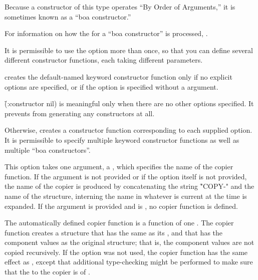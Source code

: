 Because a constructor of this type operates ``By Order of Arguments,''
it is sometimes known as a ``boa constructor.''

For information on how the  for a ``boa constructor'' is
processed, \seesection\BoaLambdaLists.

It is permissible to use the
 option more than once, so that you can define several
different constructor functions, each taking different parameters.



 creates the default-named keyword constructor function
only if no explicit  options are specified, or if the
 option is specified without a  argument.

\f{(:constructor nil)} is meaningful only when there are no other
 options specified.  It prevents 
from generating any constructors at all.

Otherwise,  creates a constructor function corresponding
to each supplied  option.  It is permissible to specify
multiple keyword constructor functions as well as multiple 
``boa constructors''.



This option takes one argument, a ,
which specifies the name of the copier
function.  If the argument is not provided or if the option itself is not
provided, the name of the copier is produced by concatenating the
string \f{"COPY-"} and the name of the structure, interning the name
in whatever  is current at the time 
is expanded.
If the argument is provided and is \nil, no copier function is defined.

The automatically defined copier function is a function of
one .  The copier function creates a  
structure that has the same  as its ,
and that has the  component values as the original 
structure; that is, the component values are not copied recursively.
If the   option was not used,
the copier function has the same effect as ,
except that additional type-checking might be performed 
to make sure that the  to the copier is
of  .

